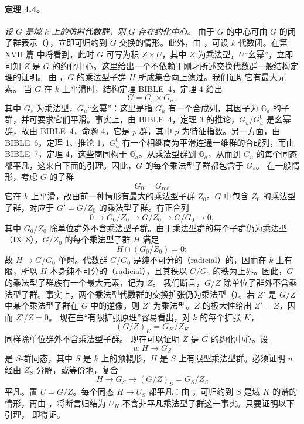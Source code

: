 \paragraph{\textbf{定理 4.4。}}
\emph{设 \(G\) 是域 \(k\) 上的仿射代数群。则 \(G\) 存在约化中心。}
由于 \(G\) 的中心可由 \(G\) 的闭子群表示（），立即可归约到 \(G\) 交换的情形。此外，由 ，可设 \(k\) 代数闭。在第 XVII 篇 中将看到，此时 \(G\) 可写为积 \(Z\times U\)，其中 \(Z\) 为乘法型，\(U\)“幺幂”，立即可知 \(Z\) 是 \(G\) 的约化中心。这里给出一个不依赖于刚才所述交换代数群一般结构定理的证明。
由 ，\(G\) 的乘法型子群 \(H\) 所成集合向上滤过。我们证明它有最大元素。
当 \(G\) 在 \(k\) 上平滑时，结构定理 BIBLE~4，定理 4 给出
\[
  G=G_s\times G_u,
\]
其中 \(G_s\) 为乘法型，\(G_u\)“幺幂”：这里是指 \(G_u\) 有一个合成列，其因子为 \(\mathbb G_a\) 的子群，并可要求它们平滑。事实上，由 BIBLE~4，定理 3 的推论，\(G_u/G_u^0\) 是幺幂群，故由 BIBLE~4，命题 4，它是 \(p\)-群，其中 \(p\) 为特征指数。另一方面，由 BIBLE~6，定理 1、推论 1，\(G_u^0\) 有一个相继商为平滑连通一维群的合成列，而由 BIBLE~7，定理 4，这些商同构于 \(\mathbb G_a\)。从乘法型群到 \(\mathbb G_a\)，从而到 \(G_u\) 的每个同态都平凡，这来自下面的引理。因此，\(G\) 的每个乘法型子群都包含于 \(G_s\)。
在一般情形，考虑 \(G\) 的子群
\[
  G_0=G_{\mathrm{red}}
\]
它在 \(k\) 上平滑，故由前一种情形有最大的乘法型子群 \(Z_0\)。\(G\) 中包含 \(Z_0\) 的乘法型子群，对应于 \(G'=G/Z_0\) 的乘法型子群。有正合列
\[
  0\longrightarrow G_0/Z_0
   \longrightarrow G/Z_0
   \longrightarrow G/G_0
   \longrightarrow 0,
\]
其中 \(G_0/Z_0\) 除单位群外不含乘法型子群。由于乘法型群的每个子群仍为乘法型（IX~8），\(G/Z_0\) 的每个乘法型子群 \(H\) 满足
\[
  H\cap(G_0/Z_0)=0;
\]
故 \(H\to G/G_0\) 单射。代数群 \(G/G_0\) 是纯不可分的（radicial）的，因而在 \(k\) 上有限，所以 \(H\) 本身纯不可分的（radicial），且其秩以 \(G/G_0\) 的秩为上界。因此，\(G\) 的乘法型子群族有一个最大元素，记为 \(Z\)。
我们断言，\(G/Z\) 除单位子群外不含乘法型子群。事实上，两个乘法型代数群的交换扩张仍为乘法型（）。若 \(Z'\) 是 \(G/Z\) 中某个乘法型子群在 \(G\) 中的逆像，则 \(Z'\) 为乘法型。\(Z\) 的极大性给出 \(Z'=Z\)，因而 \(Z'/Z=0\)。
现在由“有限扩张原理”容易看出，对 \(k\) 的每个扩张 \(K\)，
\[
  (G/Z)_K=G_K/Z_K
\]
同样除单位群外不含乘法型子群。
现在可以证明 \(Z\) 是 \(G\) 的约化中心。设
\[
  u:H\longrightarrow G_S
\]
是 \(S\)-群同态，其中 \(S\) 是 \(k\) 上的预概形，\(H\) 是 \(S\) 上有限型乘法型群。必须证明 \(u\) 经由 \(Z_S\) 分解，或等价地，复合
\[
  H\longrightarrow G_S\longrightarrow
  (G/Z)_S=G_S/Z_S
\]
平凡。置 \(U=G/Z\)。每个同态 \(H\to U_S\) 都平凡：由 ，可归约到 \(S\) 是域 \(K\) 的谱的情形，再由 ，将断言归结为 \(U_K\) 不含非平凡乘法型子群这一事实。只要证明以下引理， 即得证。
